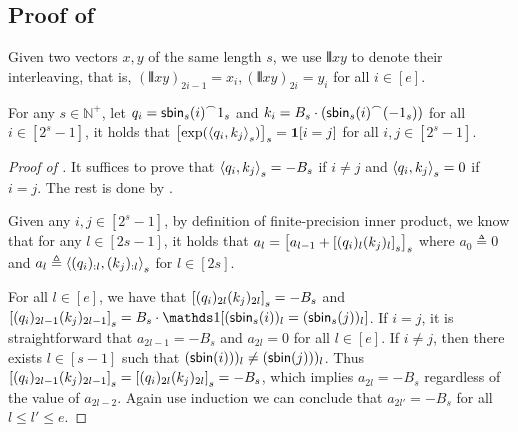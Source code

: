 \subsection{Proof of }\label{appsec:proof_cot_dlogn_main}
Given two vectors $x,y$ of the same length $s$, we use $\interleave{x}{y}$ to denote their interleaving, that is, $(\interleave{x}{y})_{2i-1} = x_i, (\interleave{x}{y})_{2i} = y_i$ for all $i\in [e]$. 
\begin{lemma}\label{lem:attention_rounding}
	For any $s\in\mathbb{N}^+$, let $q_i = {\mathsf{sbin}_s(i)}^\frown{1_s}$ and $k_i = B_s\cdot ({\mathsf{sbin}_s(i)}^\frown{(-1_s)})$ for all $i\in [2^s-1]$, it holds that $\left[\exp(\left\langle q_i,k_j \right\rangle_s)\right]_s={\bm 1}[i=j]$ for all $i,j\in [2^s-1]$.
\end{lemma}

\begin{proof}[Proof of ]
	It suffices to prove that $\left\langle q_i,k_j \right\rangle_s = -B_s$ if $i\neq j$ and $\left\langle q_i,k_j \right\rangle_s = 0$ if $i= j$. The rest is done by .
	
	Given any $i,j\in [2^s-1]$, by definition of finite-precision inner product, we know that for any $l\in [2s-1]$,  it holds that $a_{l} = \left[	a_{l-1} + \left[(q_i)_{l}(k_j)_{l}\right]_s\right]_s$ where $a_0 \triangleq 0$ and $a_{l}\triangleq \left\langle (q_i)_{:l},(k_j)_{:l} \right\rangle_s$ for $l\in [2s]$. 
	
	For all $l\in [e]$, we have that $\left[(q_i)_{2l}(k_j)_{2l}\right]_s = -B_s$ and $\rds{(q_i)_{2l-1}(k_j)_{2l-1}} = B_s\cdot \ind[(\sbin_s(i))_l = (\sbin_s(j))_l]$. If $i=j$, it is straightforward that $a_{2l-1} = -B_s$ and $a_{2l} = 0$ for all $l\in[e]$. If $i\neq j$, then there exists $l\in[s-1]$ such that $(\mathsf{sbin}(i)))_l\neq (\mathsf{sbin}(j)))_l$. Thus $\left[(q_i)_{2l-1}(k_j)_{2l-1}\right]_s = \left[(q_i)_{2l}(k_j)_{2l}\right]_s = -B_s$, which implies $a_{2l} = -B_s$ regardless of the value of $a_{2l-2}$. Again use induction we can conclude that $a_{2l'} = -B_s$ for all $l\le l' \le e $.
\end{proof}


